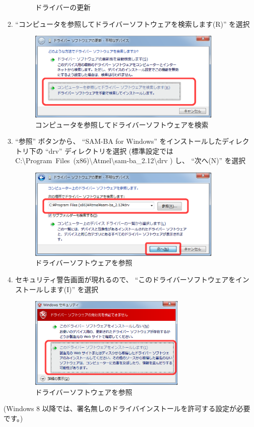 \documentclass[11pt,a4j,openany,fleqn]{jbook}
\begin{document}
\begin{enumerate}
\begin{figure}[H]
			\caption{ドライバーの更新}
			\label{fig:windriver.device_prop}
		\end{figure}
	\item ``コンピュータを参照してドライバーソフトウェアを検索します(R)'' を選択
		\begin{figure}[H]
			\centering\includegraphics[width=94mm]{windriver-install.6.driversearch.eps}
			\caption{コンピュータを参照してドライバーソフトウェアを検索}
			\label{fig:windriver.driversearch}
		\end{figure}
	\item ``参照'' ボタンから、 ``SAM-BA for Windows'' をインストールしたディレクトリ下の ``drv'' ディレクトリを選択 (標準設定では C:{\textbackslash}Program~Files~(x86){\textbackslash}Atmel{\textbackslash}sam-ba\_2.12{\textbackslash}drv ) し、 ``次へ(N)'' を選択
		\begin{figure}[H]
			\centering\includegraphics[width=94mm]{windriver-install.7.driverfile.eps}
			\caption{ドライバーソフトウェアを参照}
			\label{fig:windriver.driverfile}
		\end{figure}
	\item セキュリティ警告画面が現れるので、 ``このドライバーソフトウェアをインストールします(I)'' を選択
		\begin{figure}[H]
			\centering\includegraphics[width=76mm]{windriver-install.8.security.eps}
			\caption{ドライバーソフトウェアを参照}
			\label{fig:windriver.security}
		\end{figure}
\end{enumerate}
(Windows 8 以降では、署名無しのドライバインストールを許可する設定が必要です。)
\par
\end{document}

